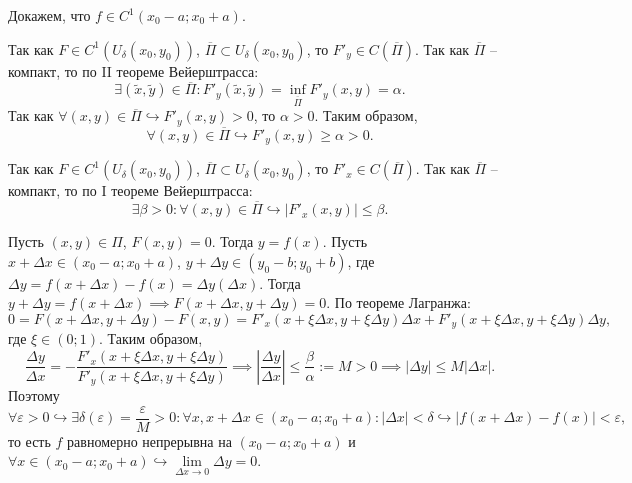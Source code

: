 \documentclass[12pt, a4paper, reqno]{article}
\begin{document}
    Докажем, что $f \in C^1(x_0 - a; x_0 + a)$.

    Так как $F \in C^1(U_{\delta}(x_0, y_0))$,
    $\overline{\Pi} \subset U_{\delta}(x_0, y_0)$, то $F'_y \in C(\overline{\Pi})$. Так как
    $\overline{\Pi}$ -- компакт, то по II теореме Вейерштрасса:
    \begin{equation*}
        \exists (\tilde{x}, \tilde{y}) \in \overline{\Pi}: F'_y(\tilde{x}, \tilde{y}) =
        \inf\limits_{\overline{\Pi}} F'_y(x, y) = \alpha.
    \end{equation*}
    Так как $\forall (x, y) \in \overline{\Pi} \hookrightarrow F'_y(x, y) > 0$, то $\alpha > 0$.
    Таким образом,
    \begin{equation*}
        \forall (x, y) \in \overline{\Pi} \hookrightarrow F'_y(x, y) \geq \alpha > 0.
    \end{equation*}

    Так как $F \in C^1(U_{\delta}(x_0, y_0))$,
    $\overline{\Pi} \subset U_{\delta}(x_0, y_0)$, то $F'_x \in C(\overline{\Pi})$. Так как
    $\overline{\Pi}$ -- компакт, то по I теореме Вейерштрасса:
    \begin{equation*}
        \exists \beta > 0: \forall (x, y) \in \overline{\Pi} \hookrightarrow |F'_x(x, y)| \leq \beta.
    \end{equation*}

    Пусть $(x, y) \in \Pi$, $F(x, y) = 0$. Тогда $y = f(x)$. Пусть $x + \Delta x \in (x_0 - a; x_0 + a)$,
    $y + \Delta y \in (y_0 - b; y_0 + b)$, где $\Delta y = f(x + \Delta x) - f(x) = \Delta y(\Delta x)$.
    Тогда $y + \Delta y = f(x + \Delta x) \implies F(x + \Delta x, y + \Delta y) = 0$. По теореме Лагранжа:
    \begin{equation*}
        0 = F(x + \Delta x, y + \Delta y) - F(x, y) = F'_x(x + \xi\Delta x, y + \xi\Delta y)\Delta x +
        F'_y(x + \xi\Delta x, y + \xi\Delta y)\Delta y,
    \end{equation*}
    где $\xi \in (0; 1)$. Таким образом,
    \begin{equation*}
        \frac{\Delta y}{\Delta x} =
        -\frac{F'_x(x + \xi\Delta x, y + \xi\Delta y)}{F'_y(x + \xi\Delta x, y + \xi\Delta y)} \implies
        \left|\frac{\Delta y}{\Delta x}\right| \leq \frac{\beta}{\alpha} := M > 0 \implies
        |\Delta y| \leq M |\Delta x|.
    \end{equation*}
    Поэтому
    \begin{equation*}
        \forall \varepsilon > 0 \hookrightarrow \exists \delta(\varepsilon) = \frac{\varepsilon}{M} > 0:
        \forall x, x + \Delta x \in (x_0 - a; x_0 + a) : |\Delta x| < \delta \hookrightarrow
        |f(x + \Delta x) - f(x)| < \varepsilon,
    \end{equation*}
    то есть $f$ равномерно непрерывна на $(x_0 - a; x_0 + a)$ и $\forall x \in (x_0 - a; x_0 + a)
    \hookrightarrow \lim\limits_{\Delta x \to 0} \Delta y = 0$.
\end{document}
